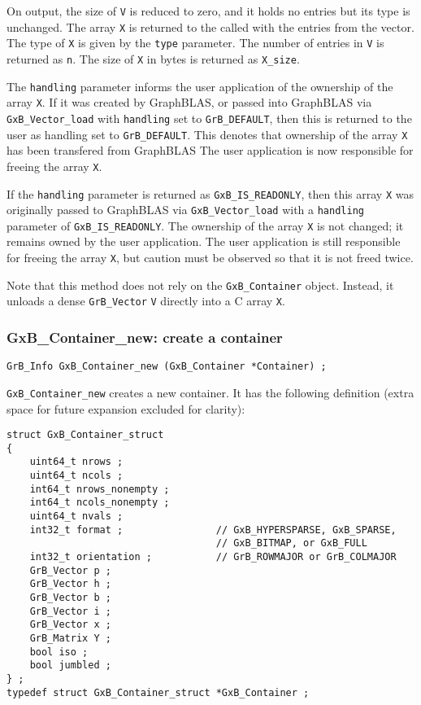 On output, the size of \verb'V' is reduced to zero, and it holds no entries but
its type is unchanged.  The array \verb'X' is returned to the called with the
entries from the vector.  The type of \verb'X' is given by the \verb'type'
parameter.  The number of entries in \verb'V' is returned as \verb'n'.
The size of \verb'X' in bytes is returned as \verb'X_size'.

The \verb'handling' parameter informs the user application of the ownership of
the array \verb'X'.  If it was created by GraphBLAS, or passed into GraphBLAS
via \verb'GxB_Vector_load' with \verb'handling' set to \verb'GrB_DEFAULT', then
this is returned to the user as handling set to \verb'GrB_DEFAULT'.  This
denotes that ownership of the array \verb'X' has been transfered from GraphBLAS
The user application is now responsible for freeing the array \verb'X'.

If the \verb'handling' parameter is returned as \verb'GxB_IS_READONLY', then
this array \verb'X' was originally passed to GraphBLAS via
\verb'GxB_Vector_load' with a \verb'handling' parameter of
\verb'GxB_IS_READONLY'.  The ownership of the array \verb'X' is not changed; it
remains owned by the user application.  The user application is still
responsible for freeing the array \verb'X', but caution must be observed so
that it is not freed twice.

Note that this method does not rely on the \verb'GxB_Container' object.
Instead, it unloads a dense \verb'GrB_Vector' \verb'V' directly into a
C array \verb'X'.

\subsubsection{{\sf GxB\_Container\_new:} create a container}
\label{container_new}

\begin{mdframed}[userdefinedwidth=6in]
{\footnotesize
\begin{verbatim}
GrB_Info GxB_Container_new (GxB_Container *Container) ;
\end{verbatim}
} \end{mdframed}

\verb'GxB_Container_new' creates a new container.  It has the following
definition (extra space for future expansion excluded for clarity):

{\footnotesize
\begin{verbatim}
struct GxB_Container_struct
{
    uint64_t nrows ;
    uint64_t ncols ;
    int64_t nrows_nonempty ;
    int64_t ncols_nonempty ;
    uint64_t nvals ;
    int32_t format ;                // GxB_HYPERSPARSE, GxB_SPARSE,
                                    // GxB_BITMAP, or GxB_FULL
    int32_t orientation ;           // GrB_ROWMAJOR or GrB_COLMAJOR
    GrB_Vector p ;
    GrB_Vector h ;
    GrB_Vector b ;
    GrB_Vector i ;
    GrB_Vector x ;
    GrB_Matrix Y ;
    bool iso ;
    bool jumbled ;
} ;
typedef struct GxB_Container_struct *GxB_Container ; \end{verbatim}}

